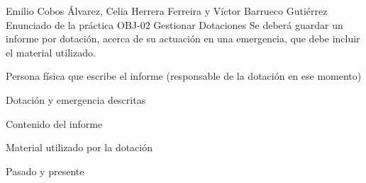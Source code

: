 {Emilio Cobos Álvarez, Celia Herrera Ferreira y Víctor Barrueco Gutiérrez}
{Enunciado de la práctica}
{OBJ-02 Gestionar Dotaciones}
{}
{Se deberá guardar un informe por dotación, acerca de su actuación en una emergencia, que debe incluir el material utilizado.}
{
\item{Persona física que escribe el informe (responsable de la dotación en ese momento)}
\item{Dotación y emergencia descritas}
\item{Contenido del informe}
\item{Material utilizado por la dotación}
}
{Pasado y presente}

